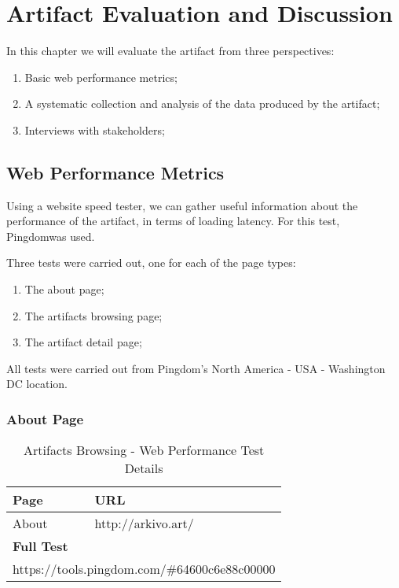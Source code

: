 \chapter{Artifact Evaluation and Discussion}
\label{chap:eval}

In this chapter we will evaluate the artifact from three perspectives:

\begin{enumerate}
    \item Basic web performance metrics;
    \item A systematic collection and analysis of the data produced by the artifact;
    \item Interviews with stakeholders;
\end{enumerate}


\section{Web Performance Metrics}

Using a website speed tester, we can gather useful information about the performance of the artifact, in terms of loading latency. For this test, Pingdom\footnotemark[1] was used.


Three tests were carried out, one for each of the page types:

\begin{enumerate}
    \item The about page;
    \item The artifacts browsing page;
    \item The artifact detail page;
\end{enumerate}

All tests were carried out from Pingdom's North America - USA - Washington DC location.

\subsection{About Page}


\begin{table}[H]
\footnotesize
\centering
\begin{tabular}{|ll|}
\hline
\multicolumn{1}{|l|}{\textbf{Page}} & \textbf{URL}                                                 \\ \hline
\multicolumn{1}{|l|}{About}         & http://arkivo.art/ \\ \hline
\multicolumn{2}{|l|}{\textbf{Full Test}}                                                                    \\ \hline
\multicolumn{2}{|l|}{https://tools.pingdom.com/\#64600c6e88c00000}                                 \\ \hline
\end{tabular}
\caption{Artifacts Browsing - Web Performance Test Details}
\label{table:browsing-test-details}
\end{table}


